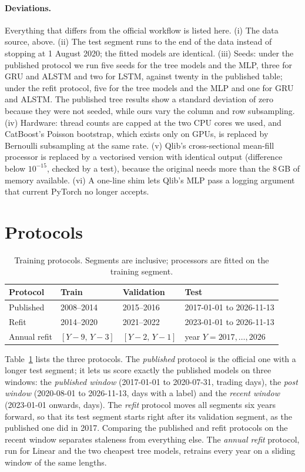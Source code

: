 \documentclass[11pt]{article}
\begin{document}
\paragraph{Deviations.}
Everything that differs from the official workflow is listed here.
(i) The data source, above.
(ii) The test segment runs to the end of the data instead of stopping at 1 August 2020; the fitted models are identical.
(iii) Seeds: under the published protocol we run five seeds for the tree models and the MLP, three for GRU and ALSTM and two for LSTM, against twenty in the published table; under the refit protocol, five for the tree models and the MLP and one for GRU and ALSTM. The published tree results show a standard deviation of zero because they were not seeded, while ours vary the column and row subsampling.
(iv) Hardware: thread counts are capped at the two CPU cores we used, and CatBoost's Poisson bootstrap, which exists only on GPUs, is replaced by Bernoulli subsampling at the same rate.
(v) Qlib's cross-sectional mean-fill processor is replaced by a vectorised version with identical output (difference below $10^{-15}$, checked by a test), because the original needs more than the 8\,GB of memory available.
(vi) A one-line shim lets Qlib's MLP pass a logging argument that current PyTorch no longer accepts.

\section{Protocols}\label{sec:protocols}

\begin{table}[t]
\centering\small
\caption{Training protocols. Segments are inclusive; processors are fitted on the training segment.}\label{tab:protocols}
\begin{tabular}{llll}
\toprule
Protocol & Train & Validation & Test \\
\midrule
Published & 2008--2014 & 2015--2016 & 2017-01-01 to 2026-11-13 \\
Refit & 2014--2020 & 2021--2022 & 2023-01-01 to 2026-11-13 \\
Annual refit & $[Y-9,\,Y-3]$ & $[Y-2,\,Y-1]$ & year $Y=2017,\dots,2026$ \\
\bottomrule
\end{tabular}
\end{table}

Table~\ref{tab:protocols} lists the three protocols.
The \emph{published} protocol is the official one with a longer test segment; it lets us score exactly the published models on three windows: the \emph{published window} (2017-01-01 to 2020-07-31, \DaysPub{} trading days), the \emph{post window} (2020-08-01 to 2026-11-13, \DaysPost{} days with a label) and the \emph{recent window} (2023-01-01 onwards, \DaysRecent{} days).
The \emph{refit} protocol moves all segments six years forward, so that its test segment starts right after its validation segment, as the published one did in 2017.
Comparing the published and refit protocols on the recent window separates staleness from everything else.
The \emph{annual refit} protocol, run for Linear and the two cheapest tree models, retrains every year on a sliding window of the same lengths.
\end{document}
